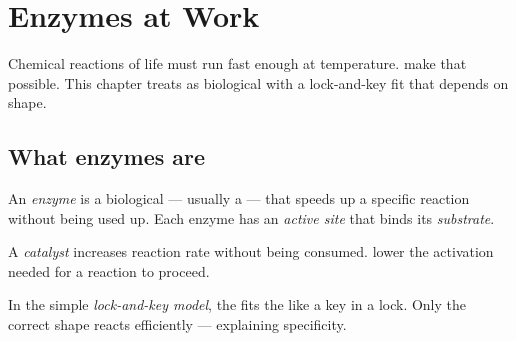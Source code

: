 \chapter{Enzymes at Work}\label{ch:g8:enzymes}

Chemical reactions of life must run fast enough at  temperature.
 make that possible. This chapter treats  as biological
 with a lock-and-key fit that depends on shape.

\section{What enzymes are}

\begin{definition}[Enzyme]\label{def:g8:enzymes:enzyme}
An \emph{enzyme} is a biological  --- usually a
 --- that speeds up a specific reaction without being used up.
Each enzyme has an \emph{active site} that binds its
\emph{substrate}.
\end{definition}

\begin{definition}[Catalyst]\label{def:g8:enzymes:catalyst}
A \emph{catalyst} increases reaction rate without being
consumed.  lower the activation  needed for a reaction to
proceed.
\end{definition}

\begin{proposition}\label{prop:g8:enzymes:lock}
In the simple \emph{lock-and-key model}, the
 fits the  like a key in a lock. Only the correct
shape reacts efficiently --- explaining  specificity.
\end{proposition}
\admitted

